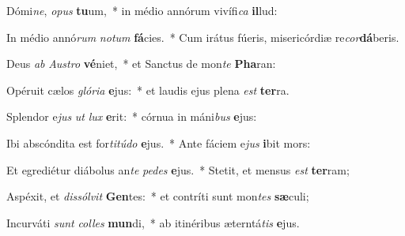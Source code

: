 \item Dómi\textit{ne}, \textit{o}\textit{pus} \textbf{tu}um,~* in médio annórum vivífi\textit{ca} \textbf{il}lud:
\item In médio annó\textit{rum} \textit{no}\textit{tum} \textbf{fá}cies.~* Cum irátus fúeris, misericórdiæ re\textit{cor}\textbf{dá}beris.
\item Deus \textit{ab} \textit{Aus}\textit{tro} \textbf{vé}niet,~* et Sanctus de mon\textit{te} \textbf{Pha}ran:
\item Opéruit cælos \textit{gló}\textit{ri}\textit{a} \textbf{e}jus:~* et laudis ejus plena \textit{est} \textbf{ter}ra.
\item Splendor e\textit{jus} \textit{ut} \textit{lux} \textbf{e}rit:~* córnua in máni\textit{bus} \textbf{e}jus:
\item Ibi abscóndita est for\textit{ti}\textit{tú}\textit{do} \textbf{e}jus.~* Ante fáciem e\textit{jus} \textbf{i}bit mors:
\item Et egrediétur diábolus an\textit{te} \textit{pe}\textit{des} \textbf{e}jus.~* Stetit, et mensus \textit{est} \textbf{ter}ram;
\item Aspéxit, et \textit{dis}\textit{sól}\textit{vit} \textbf{Gen}tes:~* et contríti sunt mon\textit{tes} \textbf{sæ}culi;
\item Incurváti \textit{sunt} \textit{col}\textit{les} \textbf{mun}di,~* ab itinéribus æterntá\textit{tis} \textbf{e}jus.
